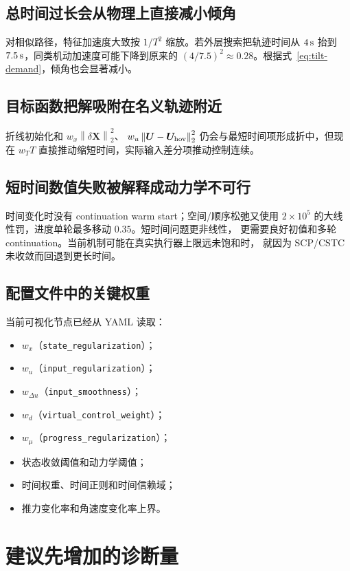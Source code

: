 \documentclass[UTF8,a4paper,11pt]{ctexart}
\newcommand{\normtwo}[1]{\left\lVert#1\right\rVert_2}
\newcommand{\code}[1]{\texttt{#1}}
\begin{document}
\subsection{总时间过长会从物理上直接减小倾角}

对相似路径，特征加速度大致按 $1/T^2$ 缩放。若外层搜索把轨迹时间从
$4\,{\rm s}$ 抬到 $7.5\,{\rm s}$，同类机动加速度可能下降到原来的
$(4/7.5)^2\approx0.28$。根据式~\eqref{eq:tilt-demand}，倾角也会显著减小。

\subsection{目标函数把解吸附在名义轨迹附近}

折线初始化和 $w_x\normtwo{\delta\bm X}^2$、
$w_u\normtwo{\bm U-\bm U_{\rm hov}}^2$ 仍会与最短时间项形成折中，但现在
$w_TT$ 直接推动缩短时间，实际输入差分项推动控制连续。

\subsection{短时间数值失败被解释成动力学不可行}

时间变化时没有 continuation warm start；空间/顺序松弛又使用
$2\times10^5$ 的大线性罚，进度单轮最多移动 $0.35$。短时间问题更非线性，
更需要良好初值和多轮 continuation。当前机制可能在真实执行器上限远未饱和时，
就因为 SCP/CSTC 未收敛而回退到更长时间。

\subsection{配置文件中的关键权重}

当前可视化节点已经从 YAML 读取：
\begin{itemize}
  \item $w_x$（\code{state\_regularization}）；
  \item $w_u$（\code{input\_regularization}）；
  \item $w_{\Delta u}$（\code{input\_smoothness}）；
  \item $w_d$（\code{virtual\_control\_weight}）；
  \item $w_\mu$（\code{progress\_regularization}）；
  \item 状态收敛阈值和动力学阈值；
  \item 时间权重、时间正则和时间信赖域；
  \item 推力变化率和角速度变化率上界。
\end{itemize}

\section{建议先增加的诊断量}
\end{document}
